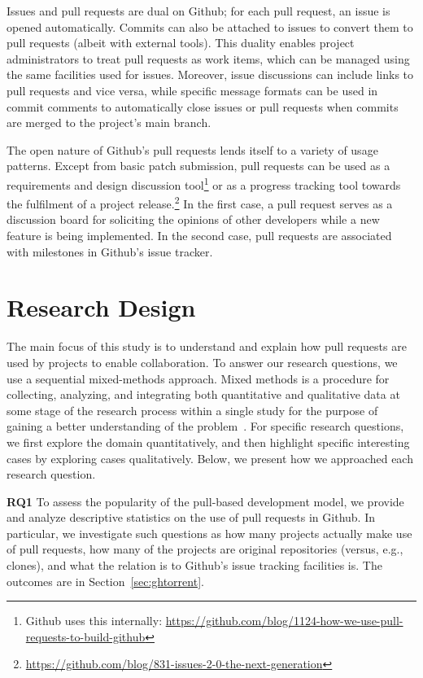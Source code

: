 \documentclass{sig-alternate}
\begin{document}
Issues and pull requests are dual on Github; for each pull request, an issue is
opened automatically. Commits can also be attached to issues to convert them to
pull requests (albeit with external tools). This duality enables project administrators to treat pull requests as work items, which can be managed using the same facilities used for issues. Moreover, issue discussions can include
links to pull requests and vice versa, while specific message formats can be used
in commit comments to automatically close issues or pull requests when commits
are merged to the project's main branch.

The open nature of Github's pull requests lends itself to a variety of usage
patterns. Except from basic patch submission, pull requests can be used as a
requirements and design discussion tool\footnote{Github uses this internally:
\url{https://github.com/blog/1124-how-we-use-pull-requests-to-build-github}} or
as a progress tracking tool towards the fulfilment of a project
release.\footnote{\url{https://github.com/blog/831-issues-2-0-the-next-generation}} In
the first case, a pull request serves as a discussion board for soliciting the
opinions of other developers while a new feature is being implemented. In the
second case, pull requests are associated with milestones in Github's issue
tracker.

\section{Research Design}
\label{sec:resdesign}

The main focus of this study is to understand and explain how pull requests are
used by projects to enable collaboration. To answer our research questions, we
use a sequential mixed-methods approach. Mixed methods is a procedure for
collecting, analyzing, and integrating both quantitative and qualitative data at
some stage of the research process within a single study for the purpose of
gaining a better understanding of the problem~\cite{Ivank06}. For specific 
research questions, we first explore the domain quantitatively,
and then highlight specific interesting cases by exploring cases qualitatively.
Below, we present how we approached each research question.

{\bfseries RQ1} To assess the popularity of the pull-based development model, we
provide and analyze descriptive statistics on the use of pull requests in Github.
In particular, we investigate such questions as how many projects actually make
use of pull requests, how many of the projects are original repositories
(versus, e.g., clones), and what the relation is to Github's issue tracking
facilities is. The outcomes are in Section~\ref{sec:ghtorrent}.
\end{document}
